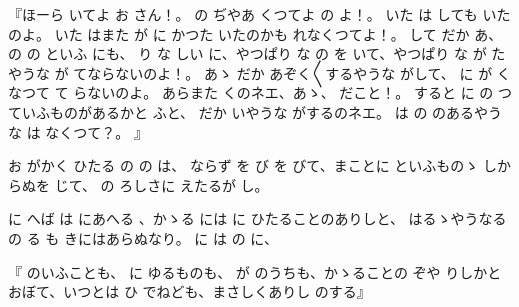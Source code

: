 『ほーら
いてよ
お
さん！。
の
ぢやあ
くつてよ
の
よ！。
いた
は
しても
いたのよ。
いた
はまた
が
に
かつた
いたのかも
れなくつてよ！。
して
だか
あ、
の
の
といふ
にも、
り
な
しい
に、やつぱり
な
の
を
いて、やつぱり
な
が
たやうな
が
てならないのよ！。
あゝ
だか
あぞく〳〵するやうな
がして、
に
が
くなつて
て
らないのよ。
あらまた
くのネエ、あゝ、
だこと！。
すると
に
の
つていふものがあるかと
ふと、
だか
いやうな
がするのネエ。
は
の
のあるやうな
は
なくつて？。
』

お
がかく
ひたる
の
の
は、
ならず
を
び
を
びて、まことに
といふものゝ
しからぬを
じて、
の
ろしさに
えたるが
し。

に
へば
は
にあへる
、かゝる
には
に
ひたることのありしと、
はるゝやうなる
の
る
も
きにはあらぬなり。
に
は
の
に、

『
のいふことも、
に
ゆるものも、
が
のうちも、かゝることの
ぞや
りしかとおぼて、いつとは
ひ
でねども、まさしくありし
のする』

